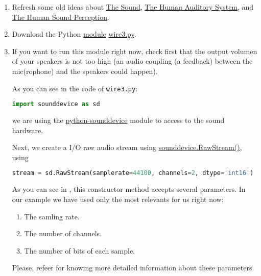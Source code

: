\begin{enumerate}

\item Refresh some old ideas about
  \href{https://vicente-gonzalez-ruiz.github.io/the_sound/}{The
    Sound},
  \href{https://vicente-gonzalez-ruiz.github.io/human_auditory_system/}{The
    Human Auditory System}, and
  \href{https://vicente-gonzalez-ruiz.github.io/human_sound_perception/}{The
    Human Sound Perception}.
  
\item Download the Python
  \href{https://docs.python.org/3/tutorial/modules.html}{module}
  \href{https://raw.githubusercontent.com/Tecnologias-multimedia/intercom/master/test/sounddevice/wire3.py}{wire3.py}.

\item If you want to run this module right now, check first that the
  output volumen of your speakers is not too high (an audio coupling
  (a feedback) between the mic(rophone) and the speakers could
  happen).

As you can see in the code of \texttt{wire3.py}:

\begin{lstlisting}[language=Python]
import sounddevice as sd
\end{lstlisting}

we are using the
\href{https://python-sounddevice.readthedocs.io/en/latest/}{python-sounddevice}
\cite{sounddevice} module to access to the sound hardware.

Next, we create a I/O raw audio stream
using \href{https://python-sounddevice.readthedocs.io/en/latest/api/raw-streams.html#sounddevice.RawStream}{sounddevice.RawStream()},
using
\begin{lstlisting}[language=Python]
stream = sd.RawStream(samplerate=44100, channels=2, dtype='int16')
\end{lstlisting}

As you can see in \cite{sounddevice}, this constructor method accepts
several parameters. In our example we have used only the most
relevants for us right now:
\begin{enumerate}
\item The samling rate.
\item The number of channels.
\item The number of bits of each sample.
\end{enumerate}
Please, refeer \cite{harmonic-analysis} for knowing more detailed
information about these parameters.


\end{enumerate}
